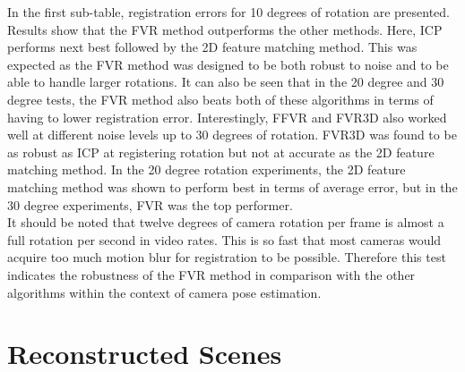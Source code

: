 In the first sub-table, registration errors for 10 degrees of rotation are presented. Results show that the FVR method outperforms the other methods. Here, ICP performs next best followed by the 2D feature matching method. This was expected as the FVR method was designed to be both robust to noise and to be able to handle larger rotations. It can also be seen that in the 20 degree and 30 degree tests, the FVR method also beats both of these algorithms in terms of having to lower registration error. Interestingly, FFVR and FVR3D also worked well at different noise levels up to 30 degrees of rotation. FVR3D was found to be as robust as ICP at registering rotation but not at accurate as the 2D feature matching method. In the 20 degree rotation experiments, the 2D feature matching method was shown to perform best in terms of average error, but in the 30 degree experiments, FVR was the top performer.  \\ 

It should be noted that twelve degrees of camera rotation per frame is almost a full rotation per second in video rates. This is so fast that most cameras would acquire too much motion blur for registration to be possible. Therefore this test indicates the robustness of the FVR method in comparison with the other algorithms within the context of camera pose estimation. \\


\section{Reconstructed Scenes}
\label{Sec:FVRQual1Exp}

